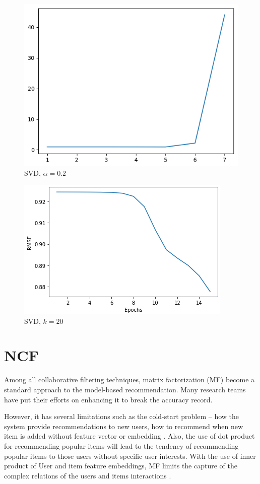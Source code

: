 \documentclass[final]{cvpr}
\begin{document}
\begin{figure}[h]
	\includegraphics{screenshot20210504225138.png}
	\caption{SVD, $\alpha=0.2$}
\end{figure}

\begin{figure}[h]
	\includegraphics{screenshot20210504230954.png}
	\caption{SVD, $k=20$}
\end{figure}

\section{\ac{NCF}}

Among all collaborative filtering techniques, matrix factorization (MF) become a standard approach to the model-based recommendation. Many research teams have put their efforts on enhancing it to break the accuracy record. 

However, it has several limitations such as the cold-start problem -- how the system provide recommendations to new users, how to recommend when new item is added without feature vector or embedding \cite{FMF}. Also, the use of dot product for recommending popular items will lead to the tendency of recommending popular items to those users without specific user interests. With the use of inner product of User and item feature embeddings, MF limits the capture of the complex relations  of the users and items interactions \cite{he2017neural}.
\end{document}
